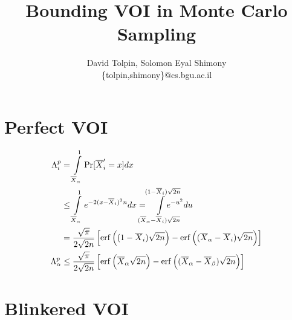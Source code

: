 \documentclass{article}
\title{Bounding VOI in Monte Carlo Sampling}
\author {David Tolpin, Solomon Eyal Shimony \\
\{tolpin,shimony\}@cs.bgu.ac.il}
\begin{document}
\maketitle

\section{Perfect VOI}

\begin{align*}
\Lambda_i^p&=\int\limits_{\overline X_\alpha}^1\Pr[\overline X_i'=x]dx\\
&\le \int\limits_{\overline X_\alpha}^1e^{-2(x-\overline X_i)^2n}dx
=\hspace{-1em}\int\limits_{(\overline X_\alpha - \overline X_i)\sqrt{2n}}^{(1- \overline X_i)\sqrt{2n}}\hspace{-2em}e^{-u^2}du\\
&=\frac {\sqrt \pi} {2 \sqrt {2n}}
  \left[\mathrm{erf}\left((1-\overline X_i)\sqrt {2n}\right)
      -\mathrm{erf}\left((\overline X_\alpha - \overline X_i)\sqrt{2n}\right)\right]\\
\Lambda_\alpha^p&\le\frac {\sqrt \pi} {2 \sqrt {2n}}
  \left[\mathrm{erf}\left(\overline X_\alpha\sqrt {2n}\right)
      -\mathrm{erf}\left((\overline X_\alpha - \overline X_\beta)\sqrt{2n}\right)\right]
\end{align*}

\section{Blinkered VOI}



\end{document}
